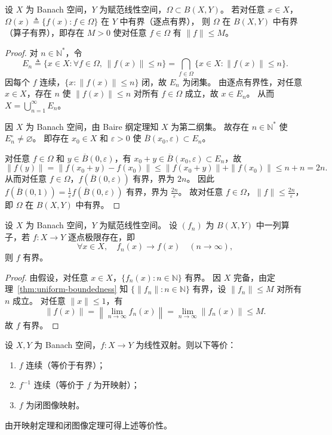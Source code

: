\documentclass[lang=cn,a4paper,newtx,section]{elegantbook}
\begin{document}
\begin{theorem}\label{thm:uniform-boundedness}
  设 $X$ 为 Banach 空间，$Y$ 为赋范线性空间，$\Omega\subset B(X,Y)$。
  若对任意 $x\in X$，$\Omega(x)\triangleq\{f(x):f\in\Omega\}$ 在 $Y$ 中有界（逐点有界），
  则 $\Omega$ 在 $B(X,Y)$ 中有界（算子有界），即存在 $M>0$ 使对任意 $f\in\Omega$ 有 $\|f\|\le M$。
\end{theorem}

\begin{proof}
  对 $n\in\mathbb{N}^*$，令
  \[
    E_n\triangleq\{x\in X:\forall f\in\Omega,\,\|f(x)\|\le n\}=\bigcap_{f\in\Omega}\{x\in X:\|f(x)\|\le n\}.
  \]
  因每个 $f$ 连续，$\{x:\|f(x)\|\le n\}$ 闭，故 $E_n$ 为闭集。
  由逐点有界性，对任意 $x\in X$，存在 $n$ 使 $\|f(x)\|\le n$ 对所有 $f\in\Omega$ 成立，故 $x\in E_n$。
  从而 $X=\bigcup_{n=1}^{\infty}E_n$。

  因 $X$ 为 Banach 空间，由 Baire 纲定理知 $X$ 为第二纲集。
  故存在 $n\in\mathbb{N}^*$ 使 $E_n^\circ\ne\varnothing$。
  即存在 $x_0\in X$ 和 $\varepsilon>0$ 使 $\overline{B}(x_0,\varepsilon)\subset E_n$。

  对任意 $f\in\Omega$ 和 $y\in\overline{B}(0,\varepsilon)$，有 $x_0+y\in\overline{B}(x_0,\varepsilon)\subset E_n$，故
  \[
    \|f(y)\|=\|f(x_0+y)-f(x_0)\|\le\|f(x_0+y)\|+\|f(x_0)\|\le n+n=2n.
  \]
  从而对任意 $f\in\Omega$，$f(\overline{B}(0,\varepsilon))$ 有界，界为 $2n$。
  因此 $f(\overline{B}(0,1))=\frac{1}{\varepsilon}f(\overline{B}(0,\varepsilon))$ 有界，界为 $\frac{2n}{\varepsilon}$。
  故对任意 $f\in\Omega$，$\|f\|\le\frac{2n}{\varepsilon}$，即 $\Omega$ 在 $B(X,Y)$ 中有界。
\end{proof}

\begin{proposition}
  设 $X$ 为 Banach 空间，$Y$ 为赋范线性空间。
  设 $(f_n)$ 为 $B(X,Y)$ 中一列算子，若 $f:X\to Y$ 逐点极限存在，即
  \[
    \forall x\in X,\quad f_n(x)\to f(x)\quad(n\to\infty),
  \]
  则 $f$ 有界。
\end{proposition}

\begin{proof}
  由假设，对任意 $x\in X$，$\{f_n(x):n\in\mathbb{N}\}$ 有界。
  因 $X$ 完备，由定理~\ref{thm:uniform-boundedness} 知 $\{\|f_n\|:n\in\mathbb{N}\}$ 有界，设 $\|f_n\|\le M$ 对所有 $n$ 成立。
  对任意 $\|x\|\le 1$，有
  \[
    \|f(x)\|=\left\|\lim_{n\to\infty}f_n(x)\right\|=\lim_{n\to\infty}\|f_n(x)\|\le M.
  \]
  故 $f$ 有界。
\end{proof}

\begin{remark}
  设 $X,Y$ 为 Banach 空间，$f:X\to Y$ 为线性双射。则以下等价：
  \begin{enumerate}
    \item $f$ 连续（等价于有界）；
    \item $f^{-1}$ 连续（等价于 $f$ 为开映射）；
    \item $f$ 为闭图像映射。
  \end{enumerate}
  由开映射定理和闭图像定理可得上述等价性。
\end{remark}
\end{document}
